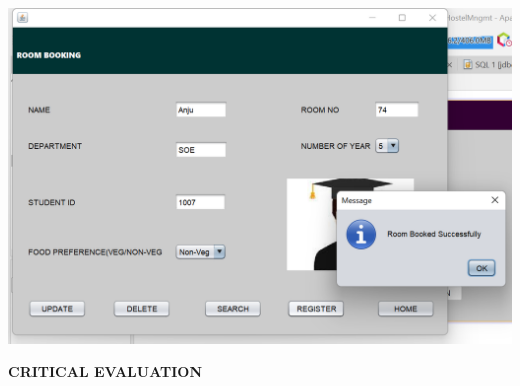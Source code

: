 \documentclass[a4paper,12pt]{report}
\begin{document}
\includegraphics[scale=0.3]{Screenshot (493).png}
\newpage
\begin{flushleft}
		\textbf{CRITICAL EVALUATION} 
\end{flushleft} 
\end{document}
